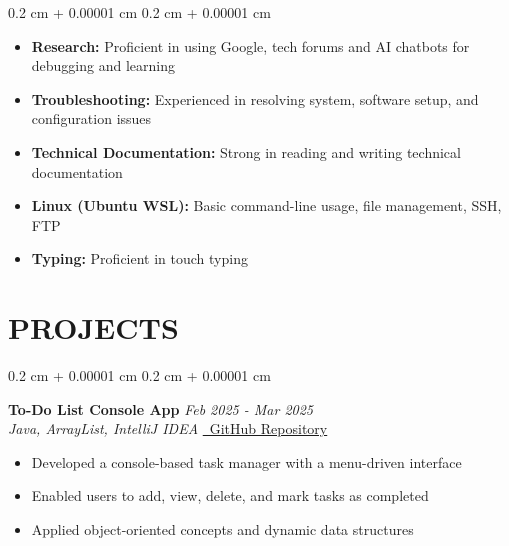 \documentclass[10pt, letterpaper]{article}
\newenvironment{onecolentry}{
    \begin{adjustwidth}{
        0.2 cm + 0.00001 cm
    }{
        0.2 cm + 0.00001 cm
    }
}{
    \end{adjustwidth}
}
\let\hrefWithoutArrow\href
\renewcommand{\href}[2]{\hrefWithoutArrow{#1}{\ifthenelse{\equal{#2}{}}{}{#2 }\raisebox{.15ex}{\footnotesize \faExternalLink*}}}
\newcommand{\githublink}[1]{\hrefWithoutArrow{https://github.com/vishal273007/#1}{\textcolor{primaryColor}{\faGithub\ \small GitHub Repository}}}
\begin{document}
    \begin{onecolentry}
        \begin{itemize}[leftmargin=*,noitemsep,topsep=0pt]
            \item \textbf{Research:} Proficient in using Google, tech forums and AI chatbots for debugging and learning
            \item \textbf{Troubleshooting:} Experienced in resolving system, software setup, and configuration issues
            \item \textbf{Technical Documentation:} Strong in reading and writing technical documentation
            \item \textbf{Linux (Ubuntu WSL):} Basic command-line usage, file management, SSH, FTP
            \item \textbf{Typing:} Proficient in touch typing
        \end{itemize}
    \end{onecolentry}
    
    \vspace{0.2 cm}
    
    \section{PROJECTS}
    \begin{onecolentry}
        \textbf{\large To-Do List Console App} \hfill \textit{Feb 2025 - Mar 2025} \\
        \textit{Java, ArrayList, IntelliJ IDEA} \hfill \githublink{todo-console-app} \\
        \vspace{0.03cm}
        \begin{itemize}[leftmargin=*,noitemsep,topsep=0pt]
            \item Developed a console-based task manager with a menu-driven interface
            \item Enabled users to add, view, delete, and mark tasks as completed
            \item Applied object-oriented concepts and dynamic data structures
        \end{itemize}
    \end{onecolentry}
    
    \vspace{0.2 cm}
    
\end{document}
